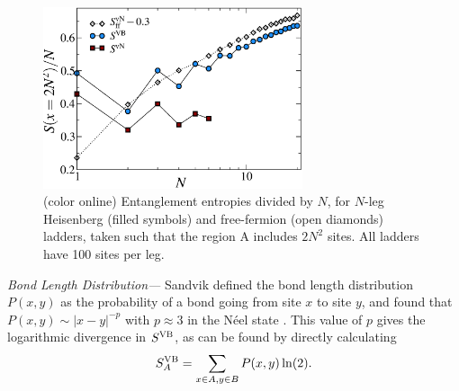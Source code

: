 \documentclass[prl,aps,twocolumn,floatfix,amsmath,amssymb,superscriptaddress,tightenlines]{revtex4}
\begin{document}

\begin{figure} { \includegraphics[width=3in]{fig4.eps} \caption{(color
online) Entanglement entropies divided by $N$,  for $N$-leg Heisenberg (filled symbols) and free-fermion (open diamonds) ladders, taken such that the region A includes $2N^2$ sites.
All ladders
have 100 sites per leg.  \label{zigzag}}} \end{figure}

{\it Bond Length Distribution---} Sandvik defined the bond length
distribution $P(x,y)$ as the probability of a bond going from site $x$ to
site $y$, and found that $P(x,y)\sim |x-y|^{-p}$ with $p\approx 3$
in the N\'eel state \cite{Sandvik}.
This value of $p$ gives the logarithmic divergence in $S^{\rm VB}$, as can be
found by directly calculating 
\begin{equation}
S^{\rm VB}_{A}=\sum_{x\in A,y\in B} P(x,y)\ln (2).
\end{equation}
\end{document}
